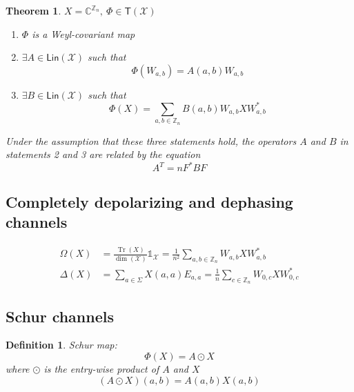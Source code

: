 \documentclass[aps,pra,onecolumn,notitlepage,superscriptaddress]{revtex4-1}
\newcommand{\Z}{\mathbb{Z}}
\newcommand{\C}{\mathbb{C}}
\newcommand{\spc}[1]{\mathcal{#1}}
\newcommand{\Lin}{\mathsf{Lin}}
\newcommand{\T}{\mathsf{T}}
\newcommand{\Tr}{\operatorname{Tr}}
\newcommand\I{\mathds{1}}
\newtheorem{theo}{Theorem}
\newtheorem{defi}{Definition}
\begin{document}
    \begin{theo}
        $X = \C^{\Z_n}, \ \Phi \in \T(\spc X)$
        \begin{enumerate}
            \item $\Phi$ is a Weyl-covariant map
            \item $\exists A \in \Lin(\spc X)$ such that
            \begin{equation}
                \Phi(W_{a,b}) = A(a,b) W_{a,b}
            \end{equation}
            \item $\exists B \in \Lin(\spc X)$ such that
            \begin{equation}
                \Phi(X) = \sum_{a,b \in \Z_n} B(a,b) W_{a,b} X W^*_{a,b}
            \end{equation}
        \end{enumerate}
        Under the assumption that these three statements hold, the operators $A$ and $B$ in statements 2 and 3 are related by the equation
        \begin{equation}
            A^T = nF^*BF
        \end{equation}

        \subsection{Completely depolarizing and dephasing channels}
        \begin{align*}
            \Omega(X) &= \frac{\Tr(X)}{\dim(\spc X)} \I_{\spc X}  = \frac{1}{n^2} \sum_{a,b \in \Z_n} W_{a,b} X W_{a,b}^* \\
            \Delta(X) &= \sum_{a \in \Sigma} X(a,a) E_{a,a} = \frac{1}{n} \sum_{c \in \Z_n} W_{0,c} X W_{0,c}^*
        \end{align*}
    \end{theo}

    \subsection{Schur channels}
    \begin{defi}
        Schur map:
        \begin{equation}
            \Phi(X) = A \odot X
        \end{equation}
        where $\odot$ is the entry-wise product of $A$ and $X$
        \begin{equation}
            (A \odot X) (a,b) = A(a,b) X(a,b)
        \end{equation}
    \end{defi}
\end{document}
